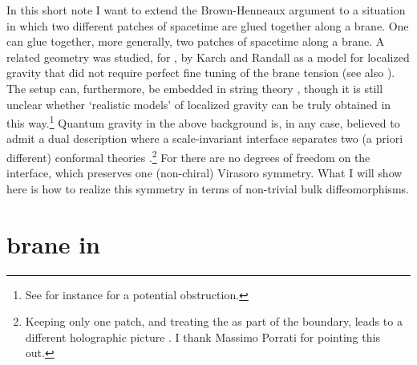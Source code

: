 \documentclass[a4paper,12pt,oneside]{article}
\begin{document}
  In this short note I want to  extend the Brown-Henneaux argument to
a situation in which  two different patches of \coordHE{}
spacetime  are glued together along a \coordHE{}  brane.
One can glue together, more generally, two patches of \coordHE{}
spacetime  along a \coordHE{} brane. 
A related  geometry was studied, for \coordHE{},  by
Karch and Randall \cite{KR1}  as a  model  for  localized gravity   
that did not require perfect fine tuning of the brane tension
(see also \cite{kalo,kim,also,Haw}). 
The setup can, furthermore,  be  embedded  in string theory \cite{BP,KR2},
though it is still  unclear whether `realistic models' of  
localized  gravity can be truly obtained in this way.\footnote{See
for instance \cite{B} for a potential obstruction.} 
Quantum gravity in the above background is, in any case,
 believed to admit  a
dual description where  a scale-invariant   interface separates two
(a priori different) conformal theories 
\cite{KR2,BDDO,DFO}.\footnote{Keeping only one \coordHE{} patch, and treating 
the \coordHE{} as part of the boundary, leads to a
different  holographic picture \cite{KR1,Por}.
I thank Massimo Porrati for pointing this out.}
 For \coordHE{} there are no degrees of freedom
on the  interface, which  preserves one (non-chiral)
Virasoro symmetry. What  I will  show here is
how to realize this symmetry in terms 
of non-trivial bulk diffeomorphisms. 




\setcounter{equation}{0}
\section{\coordHE{}  brane in \coordHE{}}
\end{document}
